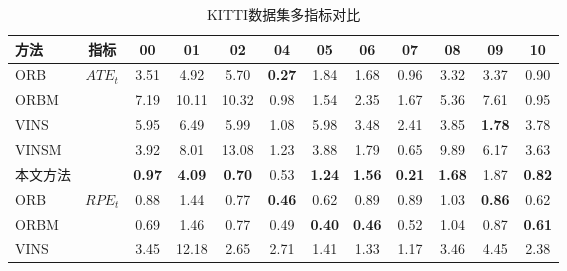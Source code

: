\begin{table}
\centering
\begin{threeparttable}
\caption{KITTI数据集多指标对比}
\begin{tabular}{lccccccccccc}
\toprule
方法    & 指标                    & 00            & 01            & 02            & 04            & 05            & 06            & 07            & 08            & 09            & 10            \\ \midrule
ORB   & \multirow{5}{*}{$ATE_t$\textdownarrow{}}  & 3.51          & 4.92          & 5.70          & \cellcolor[HTML]{FFCCC9}\textbf{0.27} & 1.84          & 1.68          & 0.96          & 3.32          & 3.37          & 0.90          \\
ORBM  &                       & 7.19          & 10.11         & 10.32         & 0.98          & 1.54          & 2.35          & 1.67          & 5.36          & 7.61          & 0.95          \\
VINS  &                       & 5.95          & 6.49          & 5.99          & 1.08          & 5.98          & 3.48          & 2.41          & 3.85          & \cellcolor[HTML]{FFCCC9}\textbf{1.78}          & 3.78          \\
VINSM &                       & 3.92          & 8.01          & 13.08         & 1.23          & 3.88          & 1.79          & 0.65          & 9.89          & 6.17          & 3.63          \\
本文方法    &                       & \cellcolor[HTML]{FFCCC9}\textbf{0.97} & \cellcolor[HTML]{FFCCC9}\textbf{4.09} & \cellcolor[HTML]{FFCCC9}\textbf{0.70} & 0.53          & \cellcolor[HTML]{FFCCC9}\textbf{1.24} & \cellcolor[HTML]{FFCCC9}\textbf{1.56} & \cellcolor[HTML]{FFCCC9}\textbf{0.21} & \cellcolor[HTML]{FFCCC9}\textbf{1.68} & 1.87 & \cellcolor[HTML]{FFCCC9}\textbf{0.82} \\ \midrule
ORB   & \multirow{5}{*}{$RPE_t$\textdownarrow{}} & 0.88          & 1.44          & 0.77          & \cellcolor[HTML]{FFCCC9}\textbf{0.46} & 0.62          & 0.89          & 0.89          & 1.03          & \cellcolor[HTML]{FFCCC9}\textbf{0.86} & 0.62          \\
ORBM  &                       & 0.69          & 1.46          & 0.77          & 0.49          & \cellcolor[HTML]{FFCCC9}\textbf{0.40} & \cellcolor[HTML]{FFCCC9}\textbf{0.46} & 0.52          & 1.04          & 0.87          & \cellcolor[HTML]{FFCCC9}\textbf{0.61} \\
VINS  &                       & 3.45          & 12.18         & 2.65          & 2.71          & 1.41          & 1.33          & 1.17          & 3.46          & 4.45          & 2.38          \\

\end{tabular}
\end{threeparttable}
\end{table}

